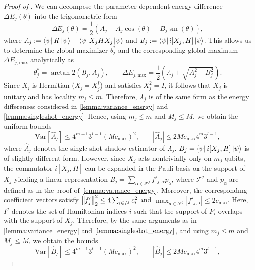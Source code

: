 \begin{proof}[Proof of ]
    We can decompose the parameter-dependent energy difference $\Delta E_j(\theta)$ into the trigonometric form
    \begin{equation}
        \Delta E_j(\theta)=\frac{1}{2}\left(A_j-A_j\cos(\theta)-B_j\sin(\theta)\right), 
    \end{equation}
    where $A_j:=\bra{\psi}H\ket{\psi}-\bra{\psi}X_jHX_j\ket{\psi}$ and $B_j:=\bra{\psi}i[X_j,H]\ket{\psi}$. This allows us to determine the global maximizer $\theta^*_j$ and the corresponding global maximum $\Delta E_{j,\mathrm{max}}$ analytically as
    \begin{equation}
        \theta^*_j =\arctan2(B_j, A_j),\qquad\Delta E_{j, \mathrm{max}}=\frac{1}{2}\left( A_j+\sqrt{A_j^2+B_j^2}\right).
    \end{equation}
    Since $X_j$ is Hermitian ($X_j=X_j^\dagger$) and satisfies $X_j^2=I$, it follows that $X_j$ is unitary and has locality $m_j\leq m$. Therefore, $A_j$ is of the same form as the energy differences considered in \cref{lemma:variance_energy} and \cref{lemma:singleshot_energy}. Hence, using $m_j\leq m$ and $M_j\leq M$, we obtain the uniform bounds
    \begin{equation}
        \mathrm{Var}[\hat{A}_j]\leq 4^{m+1}3^{l-1}(Mc_\mathrm{max})^2,\qquad \left| \hat{A}_j \right|\leq 2Mc_\mathrm{max}4^m3^{l-1},
    \end{equation}
    where $\hat{A}_j$ denotes the single-shot shadow estimator of $A_j$. $B_j=\bra{\psi}i[X_j,H]\ket{\psi}$ is of slightly different form. However, since $X_j$ acts nontrivially only on $m_j$ qubits, the commutator $i[X_j, H]$ can be expanded in the Pauli basis on the support of $X_j$ yielding a linear representation $B_j=\sum_{\alpha \in \mathcal{F}^j}f'_{j,\alpha}p_\alpha$, where $\mathcal{F}^j$ and $p_\alpha$ are defined as in the proof of \cref{lemma:variance_energy}. Moreover, the corresponding coefficient vectors satisfy $\norm{f'_j}^2_2\leq 4\sum_{i\in I^j}c_i^2$ and $\max_{\alpha\in \mathcal{F}^j}\left|f'_{j,\alpha}\right|\leq 2c_\mathrm{max}$. Here, $I^j$ denotes the set of Hamiltonian indices $i$ such that the support of $P_i$ overlaps with the support of $X_j$. Therefore, by the same arguments as in \cref{lemma:variance_energy} and $\cref{lemma:singleshot_energy}$, and using $m_j\leq m$ and $M_j\leq M$, we obtain the bounds 
    \begin{equation}
        \mathrm{Var}[\hat{B}_j]\leq 4^{m+1}3^{l-1}(Mc_\mathrm{max})^2,\qquad \left| \hat{B}_j \right|\leq 2Mc_\mathrm{max}4^m3^{l-1},

\end{equation}
\end{proof}

